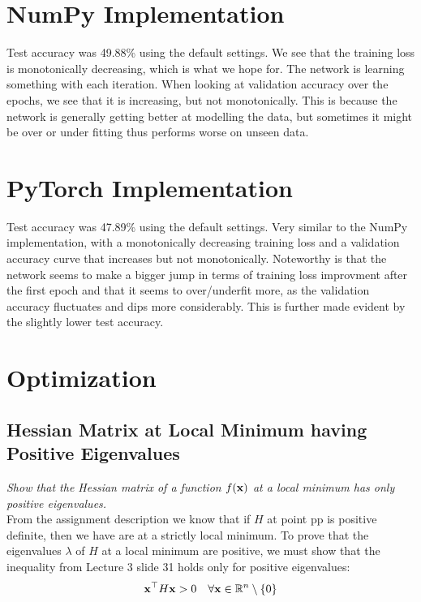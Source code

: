 \documentclass[a4paper]{article}
\begin{document}
\section{NumPy Implementation}
Test accuracy was 49.88\% using the default settings.
We see that the training loss is monotonically decreasing, which is what we hope for. The network is learning something with each
iteration. When looking at validation accuracy over the epochs, we see that it is increasing, but not monotonically. This is because
the network is generally getting better at modelling the data, but sometimes it might be over or under fitting thus performs worse
on unseen data.

\section{PyTorch Implementation}
Test accuracy was 47.89\% using the default settings.
Very similar to the NumPy implementation, with a monotonically decreasing training loss and a validation accuracy curve that increases
but not monotonically. Noteworthy is that the network seems to make a bigger jump in terms of training loss improvment after the first
epoch and that it seems to over/underfit more, as the validation accuracy fluctuates and dips more considerably. This is further
made evident by the slightly lower test accuracy.
\bigskip

\section{Optimization}
\subsection{Hessian Matrix at Local Minimum having Positive Eigenvalues}
\textit{Show that the Hessian matrix of a function $f(\mathbf{x})$ at a local minimum has only positive eigenvalues.}\\
From the assignment description we know that if $H$ at point pp is positive definite, then we have are at a strictly
local minimum. To prove that the eigenvalues $\lambda$ of $H$ at a local minimum are positive, we must show that
the inequality from Lecture 3 slide 31 holds only for positive eigenvalues:
\begin{align}
   \mathbf{x}^{\top} H \mathbf{x} > 0 \quad \forall \mathbf{x} \in \mathbb{R}^n \setminus \{0\}
\end{align}
\end{document}
